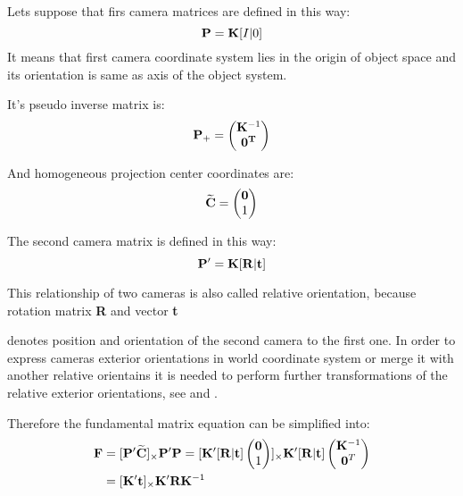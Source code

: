 \documentclass[a4paper,12pt]{report}
\newcommand{\ematr}[1]{
{\bf #1}
}
\newcommand{\evect}[1]{
{\bf #1}
}
\newcommand{\ehvect}[1]{
{\bf \widetilde{#1}}
}
\begin{document}
\begin{itemize}
Lets suppose that firs camera matrices are defined in this way:
\begin{equation}
\label{eq:rel_or_cam1}
\ematr{P}  = \ematr{K} \ematr{[}I|0\ematr{]}
\end{equation}
It means that first camera coordinate system lies in the origin of object space and its orientation is same
as axis of the object system.

It's pseudo inverse matrix is:
\begin{equation}
\ematr{P}_{+} =
\begin{pmatrix}
   \ematr{K}^{-1} \\
   \evect{0^{T}} \\
\end{pmatrix}
\end{equation}

And homogeneous projection center coordinates are:
\begin{equation}
\ehvect{C} =
\begin{pmatrix}
   \evect{0} \\
    1 \\
\end{pmatrix}
\end{equation}


The second camera matrix is defined in this way:
\begin{equation}
\label{eq:rel_or_cam2}
\ematr{P}'  = \ematr{K} \ematr{[}\ematr{R}|\evect{t}\ematr{]}
\end{equation}

This relationship of two cameras is also called relative orientation, because rotation matrix \ematr{R} and vector \evect{t}
denotes position and orientation of the second camera to the first one. In order to express cameras exterior orientations in world coordinate 
system or merge it with another relative orientains it is needed to perform further transformations of the relative 
exterior orientations, see \label{sec:ess_chain} and \label{sec:helmert}.

Therefore the fundamental matrix equation can be simplified into:
\begin{equation}
\begin{split}
\ematr{F}  &= [\ematr{P}'\ehvect{C}]_{\times} \ematr{P}'\ematr{P} 
= [\ematr{K}' [\ematr{R}|\evect{t}]
\begin{pmatrix}
   \evect{0} \\
    1 \\
\end{pmatrix}]
_{\times} 
\ematr{K}' [\ematr{R}|\evect{t}]  
\begin{pmatrix}
   \evect{K}^{-1} \\
   \evect{0}^{T} \\
\end{pmatrix} \\
&= [\ematr{K}' \evect{t}]_{\times} \ematr{K}'\ematr{R}\ematr{K}^{-1} 
\end{split}
\end{equation}


\end{itemize}
\end{document}
